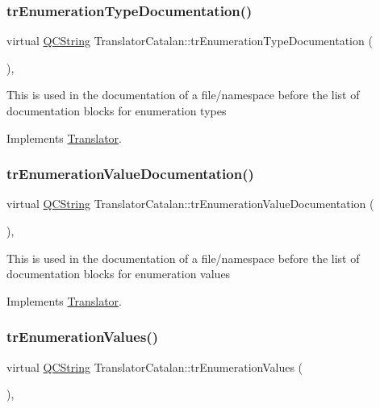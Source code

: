 \subsubsection{\texorpdfstring{trEnumerationTypeDocumentation()}{trEnumerationTypeDocumentation()}}
{\footnotesize\ttfamily virtual \mbox{\hyperlink{class_q_c_string}{Q\+C\+String}} Translator\+Catalan\+::tr\+Enumeration\+Type\+Documentation (\begin{DoxyParamCaption}{ }\end{DoxyParamCaption})\hspace{0.3cm}{\ttfamily [inline]}, {\ttfamily [virtual]}}

This is used in the documentation of a file/namespace before the list of documentation blocks for enumeration types 

Implements \mbox{\hyperlink{class_translator}{Translator}}.

\mbox{\label{class_translator_catalan_a7096434ac083f8f52bef0bb57ad7449a}} 
\subsubsection{\texorpdfstring{trEnumerationValueDocumentation()}{trEnumerationValueDocumentation()}}
{\footnotesize\ttfamily virtual \mbox{\hyperlink{class_q_c_string}{Q\+C\+String}} Translator\+Catalan\+::tr\+Enumeration\+Value\+Documentation (\begin{DoxyParamCaption}{ }\end{DoxyParamCaption})\hspace{0.3cm}{\ttfamily [inline]}, {\ttfamily [virtual]}}

This is used in the documentation of a file/namespace before the list of documentation blocks for enumeration values 

Implements \mbox{\hyperlink{class_translator}{Translator}}.

\mbox{\label{class_translator_catalan_ac19f390e3ae42d2ab7599577e939c2e7}} 
\subsubsection{\texorpdfstring{trEnumerationValues()}{trEnumerationValues()}}
{\footnotesize\ttfamily virtual \mbox{\hyperlink{class_q_c_string}{Q\+C\+String}} Translator\+Catalan\+::tr\+Enumeration\+Values (\begin{DoxyParamCaption}{ }\end{DoxyParamCaption})\hspace{0.3cm}{\ttfamily [inline]}, {\ttfamily [virtual]}}

